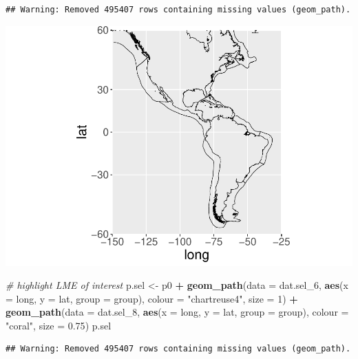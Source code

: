 \documentclass[12pt,]{article}
\newenvironment{Shaded}{\begin{snugshade}}{\end{snugshade}}
\newcommand{\CommentTok}[1]{\textcolor[rgb]{0.56,0.35,0.01}{\textit{#1}}}
\newcommand{\DataTypeTok}[1]{\textcolor[rgb]{0.13,0.29,0.53}{#1}}
\newcommand{\DecValTok}[1]{\textcolor[rgb]{0.00,0.00,0.81}{#1}}
\newcommand{\FloatTok}[1]{\textcolor[rgb]{0.00,0.00,0.81}{#1}}
\newcommand{\KeywordTok}[1]{\textcolor[rgb]{0.13,0.29,0.53}{\textbf{#1}}}
\newcommand{\NormalTok}[1]{#1}
\newcommand{\OperatorTok}[1]{\textcolor[rgb]{0.81,0.36,0.00}{\textbf{#1}}}
\newcommand{\StringTok}[1]{\textcolor[rgb]{0.31,0.60,0.02}{#1}}
\begin{document}
\begin{verbatim}
## Warning: Removed 495407 rows containing missing values (geom_path).
\end{verbatim}

\includegraphics{lme_extractions_files/figure-latex/unnamed-chunk-4-1.pdf}

\begin{Shaded}
\begin{Highlighting}[]
\CommentTok{# highlight LME of interest}
\NormalTok{p.sel <-}\StringTok{ }\NormalTok{p0 }\OperatorTok{+}
\StringTok{  }\KeywordTok{geom_path}\NormalTok{(}\DataTypeTok{data =}\NormalTok{ dat.sel_}\DecValTok{6}\NormalTok{,}
            \KeywordTok{aes}\NormalTok{(}\DataTypeTok{x =}\NormalTok{ long, }\DataTypeTok{y =}\NormalTok{ lat, }\DataTypeTok{group =}\NormalTok{ group),}
            \DataTypeTok{colour =} \StringTok{"chartreuse4"}\NormalTok{, }\DataTypeTok{size =} \DecValTok{1}\NormalTok{) }\OperatorTok{+}
\StringTok{  }\KeywordTok{geom_path}\NormalTok{(}\DataTypeTok{data =}\NormalTok{ dat.sel_}\DecValTok{8}\NormalTok{,}
            \KeywordTok{aes}\NormalTok{(}\DataTypeTok{x =}\NormalTok{ long, }\DataTypeTok{y =}\NormalTok{ lat, }\DataTypeTok{group =}\NormalTok{ group),}
            \DataTypeTok{colour =} \StringTok{"coral"}\NormalTok{, }\DataTypeTok{size =} \FloatTok{0.75}\NormalTok{)}
\NormalTok{p.sel}
\end{Highlighting}
\end{Shaded}

\begin{verbatim}
## Warning: Removed 495407 rows containing missing values (geom_path).
\end{verbatim}
\end{document}
